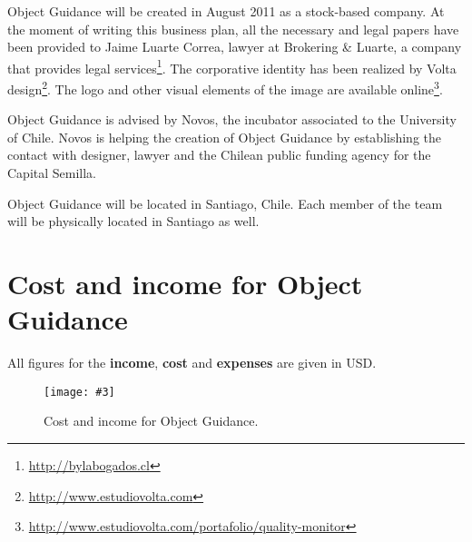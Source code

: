 \documentclass[runningheads]{llncs}
\newcommand{\fig}[4]{
	\begin{figure}[#1]
		\centering
		\texttt{[image: \#3]}
		\caption{\label{fig:#3}#4}
	\end{figure}}
\begin{document}
Object Guidance will be created in August 2011 as a stock-based company. At the moment of writing this business plan, all the necessary and legal papers have been provided to Jaime Luarte Correa, lawyer at Brokering \& Luarte, a company that provides legal services\footnote{\url{http://bylabogados.cl}}. The corporative identity has been realized by Volta design\footnote{\url{http://www.estudiovolta.com}}. The logo and other visual elements of the image are available online\footnote{\url{http://www.estudiovolta.com/portafolio/quality-monitor}}.

Object Guidance is advised by Novos, the incubator associated to the University of Chile. Novos is helping the creation of Object Guidance by establishing the contact with designer, lawyer and the Chilean public funding agency for the Capital Semilla.

Object Guidance will be located in Santiago, Chile. Each member of the team will be physically located in Santiago as well.




\appendix
\section{Cost and income for Object Guidance}

All figures for the \textbf{income}, \textbf{cost} and \textbf{expenses} are given in USD.

\fig{}{1.3}{incomeSheet}{Cost and income for Object Guidance.}
\end{document}
